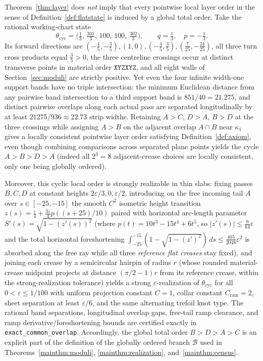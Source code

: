 \begin{remark}\label{rem:cyclic-counterexample}
Theorem~\ref{thm:layer} does \emph{not} imply that every pointwise local layer order in the sense of Definition~\ref{def:flatstate} is induced by a global total order. Take the rational working-chart state
\[
  \theta_{\mathrm{cyc}}=\bigl(\tfrac13,\,\tfrac{301}3,\,100,\,100,\,\tfrac{302}3\bigr),
  \qquad q=\tfrac13,\quad p=-\tfrac13.
\]
Its forward directions are $(-\tfrac45,-\tfrac35),(1,0),(-\tfrac45,\tfrac35),(\tfrac7{25},-\tfrac{24}{25})$, all three turn cross products equal $\tfrac35>0$, the three centreline crossings occur at distinct transverse points in material order $\mathtt{XYZXYZ}$, and all eight walls of Section~\ref{sec:moduli} are strictly positive. Yet even the four infinite width-one support bands have no triple intersection: the minimum Euclidean distance from any pairwise band intersection to a third support band is $851/40=21.275$, and distinct pairwise overlaps along each actual pass are separated longitudinally by at least $21275/936\approx22.73$ strip widths. Retaining $A>C$, $D>A$, $B>D$ at the three crossings while assigning $A>B$ on the adjacent overlap $A\cap B$ near $\kappa_1$ gives a locally consistent pointwise layer order satisfying Definition~\ref{def:axiom}, even though combining comparisons across separated plane points yields the cycle $A>B>D>A$ (indeed all $2^3=8$ adjacent-crease choices are locally consistent, only one being globally ordered).

Moreover, this cyclic local order is strongly realizable in thin slabs: fixing passes $B,C,D$ at constant heights $2\varepsilon/3,0,\varepsilon/2$, introducing on the free incoming tail $A$ over $s\in[-25,-15]$ the smooth $C^2$ isometric height transition $z(s)=\frac\varepsilon4+\frac{3\varepsilon}4 p((s+25)/10)$ paired with horizontal arc-length parameter $S'(s)=\sqrt{1-(z'(s))^2}$ (where $p(t)=10t^3-15t^4+6t^5$, so $|z'(s)|\le\frac{9}{64}\varepsilon$ and the total horizontal foreshortening $\int_{-25}^{-15}(1-\sqrt{1-(z')^2})\,ds\le\frac{405}{2048}\varepsilon^2$ is absorbed along the free ray while all three \emph{reference flat creases} stay fixed), and joining each crease by a semicircular hairpin of radius $r$ (whose rounded material-crease midpoint projects at distance $(\pi/2-1)r$ from its reference crease, within the strong-realization tolerance) yields a strong $\varepsilon$-realization of $\theta_{\mathrm{cyc}}$ for all $0<\varepsilon\le 1/100$ with uniform projection constant $C=1$, collar constant $C_{\mathrm{ram}}=2$, sheet separation at least $\varepsilon/6$, and the same alternating trefoil knot type. The rational band separations, longitudinal overlap gaps, free-tail ramp clearance, and ramp derivative/foreshortening bounds are certified exactly in \texttt{exact\_common\_overlap}. Accordingly, the global total order $B>D>A>C$ is an explicit part of the definition of the globally ordered branch $\mathcal B$ used in Theorems~\ref{mainthm:moduli}, \ref{mainthm:realization}, and~\ref{mainthm:census}.
\end{remark}

